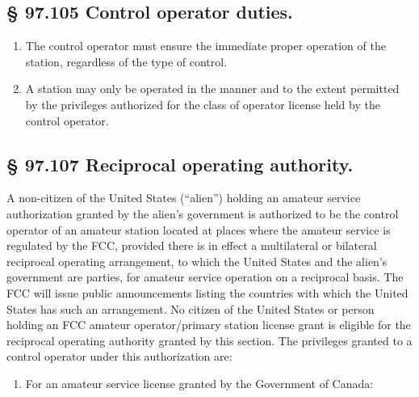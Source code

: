 \documentclass[
  letterpaper,
  DIV=11,
  numbers=noendperiod]{scrreport}
\providecommand{\tightlist}{%
  \setlength{\itemsep}{0pt}\setlength{\parskip}{0pt}}\usepackage{longtable,booktabs,array}
\begin{document}
\hypertarget{control-operator-duties.}{%
\subsection*{§ 97.105 Control operator
duties.}\label{control-operator-duties.}}

\begin{enumerate}
\def\labelenumi{(\alph{enumi})}
\item
  The control operator must ensure the immediate proper operation of the
  station, regardless of the type of control.
\item
  A station may only be operated in the manner and to the extent
  permitted by the privileges authorized for the class of operator
  license held by the control operator.
\end{enumerate}

\hypertarget{reciprocal-operating-authority.}{%
\subsection*{§ 97.107 Reciprocal operating
authority.}\label{reciprocal-operating-authority.}}

A non-citizen of the United States (``alien'') holding an amateur
service authorization granted by the alien's government is authorized to
be the control operator of an amateur station located at places where
the amateur service is regulated by the FCC, provided there is in effect
a multilateral or bilateral reciprocal operating arrangement, to which
the United States and the alien's government are parties, for amateur
service operation on a reciprocal basis. The FCC will issue public
announcements listing the countries with which the United States has
such an arrangement. No citizen of the United States or person holding
an FCC amateur operator/primary station license grant is eligible for
the reciprocal operating authority granted by this section. The
privileges granted to a control operator under this authorization are:

\begin{enumerate}
\def\labelenumi{(\alph{enumi})}
\tightlist
\item
  For an amateur service license granted by the Government of Canada:
\end{enumerate}
\end{document}
